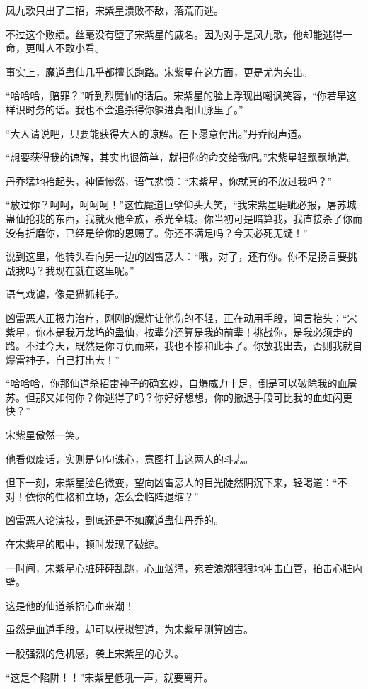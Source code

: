 \begin{this_body}
凤九歌只出了三招，宋紫星溃败不敌，落荒而逃。

不过这个败绩。丝毫没有堕了宋紫星的威名。因为对手是凤九歌，他却能逃得一命，更叫人不敢小看。

事实上，魔道蛊仙几乎都擅长跑路。宋紫星在这方面，更是尤为突出。

“哈哈哈，赔罪？”听到烈魔仙的话后。宋紫星的脸上浮现出嘲讽笑容，“你若早这样识时务的话。我也不会追杀得你躲进真阳山脉里了。”

“大人请说吧，只要能获得大人的谅解。在下愿意付出。”丹乔闷声道。

“想要获得我的谅解，其实也很简单，就把你的命交给我吧。”宋紫星轻飘飘地道。

丹乔猛地抬起头，神情惨然，语气悲愤：“宋紫星，你就真的不放过我吗？”

“放过你？呵呵，呵呵呵！”这位魔道巨擘仰头大笑，“我宋紫星睚眦必报，屠苏城蛊仙抢我的东西，我就灭他全族，杀光全城。你当初可是暗算我，我直接杀了你而没有折磨你，已经是给你的恩赐了。你还不满足吗？今天必死无疑！”

说到这里，他转头看向另一边的凶雷恶人：“哦，对了，还有你。你不是扬言要挑战我吗？我现在就在这里呢。”

语气戏谑，像是猫抓耗子。

凶雷恶人正极力治疗，刚刚的爆炸让他伤的不轻，正在动用手段，闻言抬头：“宋紫星，你本是我万龙坞的蛊仙，按辈分还算是我的前辈！挑战你，是我必须走的路。不过今天，既然是你寻仇而来，我也不掺和此事了。你放我出去，否则我就自爆雷神子，自己打出去！”

“哈哈哈，你那仙道杀招雷神子的确玄妙，自爆威力十足，倒是可以破除我的血屠苏。但那又如何你？你逃得了吗？你好好想想，你的撤退手段可比我的血虹闪更快？”

宋紫星傲然一笑。

他看似废话，实则是句句诛心，意图打击这两人的斗志。

但下一刻，宋紫星脸色微变，望向凶雷恶人的目光陡然阴沉下来，轻喝道：“不对！依你的性格和立场，怎么会临阵退缩？”

凶雷恶人论演技，到底还是不如魔道蛊仙丹乔的。

在宋紫星的眼中，顿时发现了破绽。

一时间，宋紫星心脏砰砰乱跳，心血汹涌，宛若浪潮狠狠地冲击血管，拍击心脏内壁。

这是他的仙道杀招心血来潮！

虽然是血道手段，却可以模拟智道，为宋紫星测算凶吉。

一股强烈的危机感，袭上宋紫星的心头。

“这是个陷阱！！”宋紫星低吼一声，就要离开。


\end{this_body}
